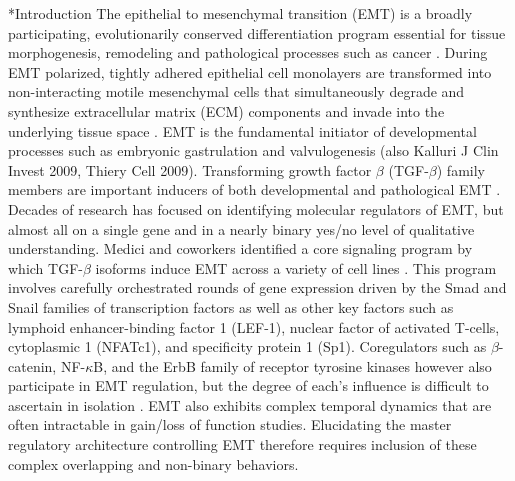 \documentclass[12pt]{article}
\makeatletter
\renewcommand\section{\@startsection
	{subsection}{2}{0mm}
	{-0.2in}
	{0.05\baselineskip}
	{\normalfont\large\bfseries}}
\makeatother
\begin{document}
\linenumbers

\section*{Introduction}
The epithelial to mesenchymal transition (EMT) is a broadly participating, evolutionarily conserved differentiation program essential for tissue morphogenesis, remodeling and pathological processes such as cancer \citep{Thiery:2003il}. During EMT polarized, tightly adhered epithelial cell monolayers are transformed into non-interacting motile mesenchymal cells that simultaneously degrade and synthesize extracellular matrix (ECM) components and invade into the underlying tissue space \citep{Stahl:2001pd}. EMT is the fundamental initiator of developmental processes such as embryonic gastrulation and valvulogenesis \citep{Eisenberg:1995ai} (also Kalluri J Clin Invest 2009, Thiery Cell 2009). Transforming growth factor $\beta$ (TGF-$\beta$) family members are important inducers of both developmental and pathological EMT \citep{Zavadil:2005fu,Xu:2009oq}. Decades of research has focused on identifying molecular regulators of EMT, but almost all on a single gene and in a nearly binary yes/no level of qualitative understanding. Medici and coworkers identified a core signaling program by which TGF-$\beta$ isoforms induce EMT across a variety of cell lines \citep{Medici:2006qa,Medici:2008fk}.
This program involves carefully orchestrated rounds of gene expression driven by the Smad and Snail families of transcription factors as well as
other key factors such as lymphoid enhancer-binding factor 1 (LEF-1), nuclear factor of activated T-cells, cytoplasmic 1 (NFATc1), and specificity protein 1 (Sp1).
Coregulators such as $\beta$-catenin, NF-$\kappa$B, and the ErbB family of receptor tyrosine kinases however also participate in EMT regulation, but the degree of each's influence is difficult to ascertain in isolation \citep{Kim:2002lh,Jiang:2007aa,Huber:2004aa,Hardy:2010aa}.
EMT also exhibits complex temporal dynamics that are often intractable in gain/loss of function studies.
Elucidating the master regulatory architecture controlling EMT therefore requires inclusion of these complex overlapping and non-binary behaviors.
\end{document}

